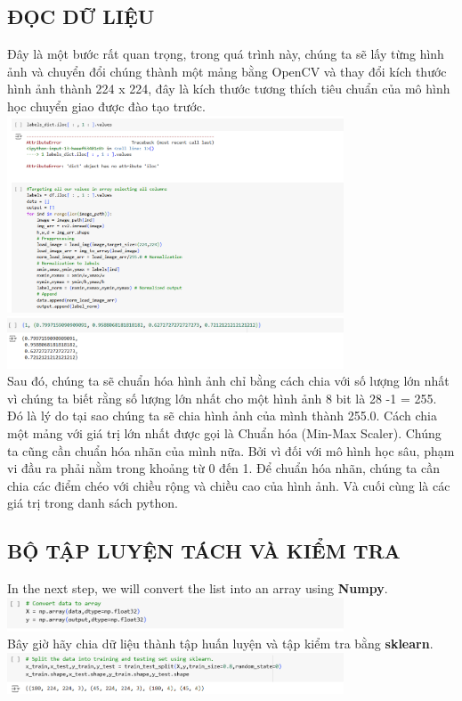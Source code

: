 \documentclass{article}
\begin{document}
\subsection{ĐỌC DỮ LIỆU}

Đây là một bước rất quan trọng, trong quá trình này, chúng ta sẽ lấy từng hình ảnh và chuyển đổi chúng thành một mảng bằng OpenCV và thay đổi kích thước hình ảnh thành 224 x 224, đây là kích thước tương thích tiêu chuẩn của mô hình học chuyển giao được đào tạo trước.\\
\includegraphics[width=10cm]{img/img1/3.1.png}\\
\includegraphics[width=10cm]{img/img1/3.1.1.png}\\

Sau đó, chúng ta sẽ chuẩn hóa hình ảnh chỉ bằng cách chia với số lượng lớn nhất vì chúng ta biết rằng số lượng lớn nhất cho một hình ảnh 8 bit là 28 -1 = 255. Đó là lý do tại sao chúng ta sẽ chia hình ảnh của mình thành 255.0. Cách chia một mảng với giá trị lớn nhất được gọi là Chuẩn hóa (Min-Max Scaler). Chúng ta cũng cần chuẩn hóa nhãn của mình nữa. Bởi vì đối với mô hình học sâu, phạm vi đầu ra phải nằm trong khoảng từ 0 đến 1. Để chuẩn hóa nhãn, chúng ta cần chia các điểm chéo với chiều rộng và chiều cao của hình ảnh. Và cuối cùng là các giá trị trong danh sách python.
\subsection{BỘ TẬP LUYỆN TÁCH VÀ KIỂM TRA }
In the next step, we will convert the list into an array using \textbf{Numpy}.\\
\includegraphics[width=10cm]{img/img1/3.2.png}\\
Bây giờ hãy chia dữ liệu thành tập huấn luyện và tập kiểm tra bằng \textbf{sklearn}.
\includegraphics[width=10cm]{img/img1/3.2.2.png}\\
\end{document}
